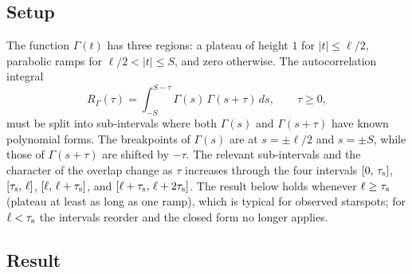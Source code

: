 \documentclass[preprint]{aastex702}
\begin{document}
\subsection{Setup}

The function $\Gamma(t)$ has three regions: a plateau of height $1$ for $|t| \leq \ell/2$, parabolic ramps for $\ell/2 < |t| \leq S$, and zero otherwise. The autocorrelation integral
\begin{equation}
    R_\Gamma(\tau) = \int_{-S}^{S-\tau} \Gamma(s)\,\Gamma(s+\tau)\,ds, \qquad \tau \geq 0,
\end{equation}
must be split into sub-intervals where both $\Gamma(s)$ and $\Gamma(s+\tau)$ have known polynomial forms. The breakpoints of $\Gamma(s)$ are at $s = \pm\ell/2$ and $s = \pm S$, while those of $\Gamma(s+\tau)$ are shifted by $-\tau$. The relevant sub-intervals and the character of the overlap change as $\tau$ increases through the four intervals $[0,\,\tau_{\rm s}]$, $[\tau_{\rm s},\,\ell]$, $[\ell,\,\ell+\tau_{\rm s}]$, and $[\ell+\tau_{\rm s},\,\ell+2\tau_{\rm s}]$. The result below holds whenever $\ell \geq \tau_{\rm s}$ (plateau at least as long as one ramp), which is typical for observed starspots; for $\ell < \tau_{\rm s}$ the intervals reorder and the closed form no longer applies.

\subsection{Result}
\end{document}
